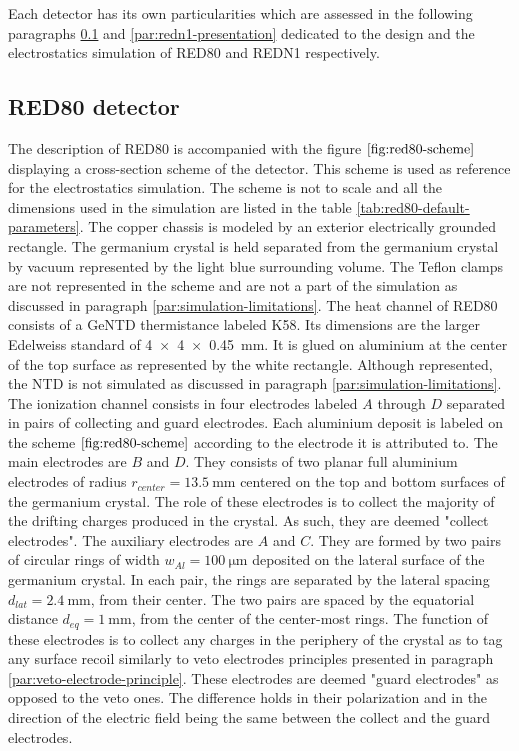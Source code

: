 Each detector has its own particularities which are assessed in the following paragraphs \ref{par:red80-presentation} and \ref{par:redn1-presentation} dedicated to the design and the electrostatics simulation of RED80 and REDN1 respectively.


\subsection{RED80 detector}
\label{par:red80-presentation}

The description of RED80 is accompanied with the figure $\ref{fig:red80-scheme}$ displaying a cross-section scheme of the detector. This scheme is used as reference for the electrostatics simulation. The scheme is not to scale and all the dimensions used in the simulation are listed in the table \ref{tab:red80-default-parameters}.
The copper chassis is modeled by an exterior electrically grounded rectangle. The germanium crystal is held separated from the germanium crystal by vacuum represented by the light blue surrounding volume.
The Teflon clamps are not represented in the scheme and are not a part of the simulation as discussed in paragraph \ref{par:simulation-limitations}.
The heat channel of RED80 consists of a GeNTD thermistance labeled K58. Its dimensions are the larger Edelweiss standard of \SI{4 x 4 x 0.45}{\mm}. It is glued on aluminium at the center of the top surface as represented by the white rectangle. Although represented, the NTD is not simulated as discussed in paragraph \ref{par:simulation-limitations}.
The ionization channel consists in four electrodes labeled $A$ through $D$ separated in pairs of collecting and guard electrodes. Each aluminium deposit is labeled on the scheme $\ref{fig:red80-scheme}$ according to the electrode it is attributed to.
The main electrodes are $B$ and $D$. They consists of two planar full aluminium electrodes of radius $r_{center} = \SI{13.5}{\mm}$ centered on the top and bottom surfaces of the germanium crystal. The role of these electrodes is to collect the majority of the drifting charges produced in the crystal. As such, they are deemed "collect electrodes".
The auxiliary electrodes are $A$ and $C$. They are formed by two pairs of circular rings of width $w_{Al}=\SI{100}{\micro\meter}$ deposited on the lateral surface of the germanium crystal. In each pair, the rings are separated by the lateral spacing $d_{lat}=\SI{2.4}{\mm}$, from their center. The two pairs are spaced by the equatorial distance $d_{eq} = \SI{1}{\mm}$, from the center of the center-most rings. The function of these electrodes is to collect any charges in the periphery of the crystal as to tag any surface recoil similarly to veto electrodes principles presented in paragraph \ref{par:veto-electrode-principle}. These electrodes are deemed "guard electrodes" as opposed to the veto ones. The difference holds in their polarization and in the direction of the electric field being the same between the collect and the guard electrodes.
